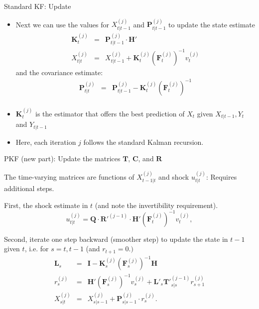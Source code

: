 \begin{frame}{Standard KF: Update}
\label{details_pred_upd}
\begin{itemize}
\item Next we can use the values for $X^{(j)}_{t|t-1}$ and $\mathbf{P}^{(j)}_{t|t-1}$
to update the state estimate
\begin{eqnarray*}\label{eq:update1}
\mathbf{K}^{(j)}_t  &=&  \mathbf{P}^{(j)}_{t|t-1}\cdot\mathbf{H}'\\
X^{(j)}_{t|t} &=& X^{(j)}_{t|t-1}+\mathbf{K}^{(j)}_t \left(\mathbf{F}^{(j)}_{t}\right)^{-1}v^{(j)}_t  \nonumber
\end{eqnarray*}
and the covariance estimate:
\begin{eqnarray*}\label{eq:update1n}
\mathbf{P}^{(j)}_{t|t} &=& \mathbf{P}^{(j)}_{t|t-1}-\mathbf{K}^{(j)}_t\left(\mathbf{F}^{(j)}_{t}\right)^{-1}\\
\end{eqnarray*}
\item $\mathbf{K}^{(j)}_t$ is the estimator that offers the best prediction of $X_t$ given $X_{t|t-1},Y_{t}$ and $Y_{t|t-1}$
\item Here, each iteration $j$ follows the standard Kalman recursion.
\end{itemize}
\end{frame}

\begin{frame}{PKF (new part): Update the matrices $\mathbf{T}$, $\mathbf{C}$, and $\mathbf{R}$}
\begin{wideitemize}
\item The time-varying matrices are functions of $X^{(j)}_{t-1|t}$ and shock $u^{(j)}_{t|t}$: Requires additional steps.
\item First, the shock estimate in $t$ (and note the invertibility requirement).
\begin{equation*}
u^{(j)}_{t|t} =  \mathbf{Q}\cdot \mathbf{R}'^{(j-1)}\cdot \mathbf{H}' \left(\mathbf{F}^{(j)}_{t}\right)^{-1} v^{(j)}_{t},
\end{equation*}
\item Second, iterate one step backward (smoother step) to update the state in $t-1$ given $t$,  i.e. for $s=t,t-1$ (and $r_{t+1}=0.)$
\begin{eqnarray*}
\mathbf{L}_s &=& \mathbf{I} - \mathbf{K}^{(j)}_s \left(\mathbf{F}^{(j)}_{s}\right)^{-1} \mathbf{H}\\
r^{(j)}_{s} &=& \mathbf{H}' \left(\mathbf{F}^{(j)}_{s}\right)^{-1} v^{(j)}_{s}+\mathbf{L}'_s\mathbf{T}'^{(j-1)}_{s|s}r^{(j)}_{s+1} \nonumber\\ 
X^{(j)}_{s|t} &=& X^{(j)}_{s|s-1}+\mathbf{P}^{(j)}_{s|s-1}\cdot r^{(j)}_{s}.
\end{eqnarray*}
\end{wideitemize}
\end{frame}

